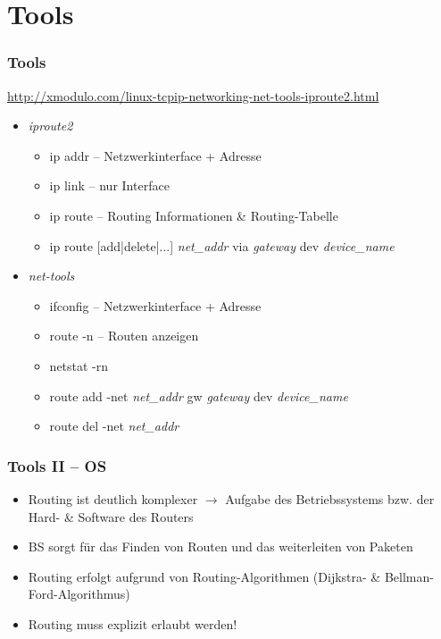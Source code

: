 \documentclass[xcolor=dvipsnames, aspectratio=169]{beamer}
\begin{document}
\section{Tools}
\begin{frame}
	\frametitle{Tools}
	\vspace{-0.75cm}
	\url{http://xmodulo.com/linux-tcpip-networking-net-tools-iproute2.html}
	\begin{itemize}
		\item \emph{iproute2}
		\begin{itemize}
			\item ip addr -- Netzwerkinterface + Adresse
			\item ip link -- nur Interface
			\item ip route -- Routing Informationen \& Routing-Tabelle
			\item ip route [add|delete|...] \emph{net\_addr} via \emph{gateway} dev \emph{device\_name}
		\end{itemize}
		\item \emph{net-tools}
		\begin{itemize}
			\item ifconfig -- Netzwerkinterface + Adresse
			\item route -n -- Routen anzeigen
			\item netstat -rn
			\item route add -net \emph{net\_addr} gw \emph{gateway} dev \emph{device\_name}
			\item route del -net \emph{net\_addr}
		\end{itemize}
	\end{itemize}
\end{frame}

\begin{frame}
	\frametitle{Tools II -- OS}
	\begin{itemize}
		\item Routing ist deutlich komplexer $\rightarrow$ Aufgabe des Betriebssystems bzw. der Hard- \& Software des Routers
		\item BS sorgt für das Finden von Routen und das weiterleiten von Paketen
		\item Routing erfolgt aufgrund von Routing-Algorithmen (Dijkstra- \& Bellman-Ford-Algorithmus)
		\item Routing muss explizit erlaubt werden!
	\end{itemize}
\end{frame}
\end{document}
